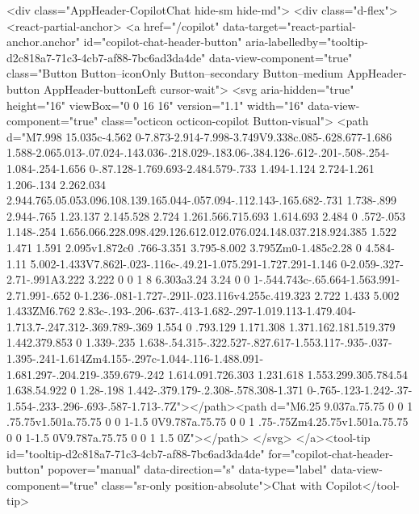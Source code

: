         
          <div class="AppHeader-CopilotChat hide-sm hide-md">
  <div class="d-flex">
    <react-partial-anchor>
        <a href="/copilot" data-target="react-partial-anchor.anchor" id="copilot-chat-header-button" aria-labelledby="tooltip-d2c818a7-71c3-4cb7-af88-7bc6ad3da4de" data-view-component="true" class="Button Button--iconOnly Button--secondary Button--medium AppHeader-button AppHeader-buttonLeft cursor-wait">  <svg aria-hidden="true" height="16" viewBox="0 0 16 16" version="1.1" width="16" data-view-component="true" class="octicon octicon-copilot Button-visual">
    <path d="M7.998 15.035c-4.562 0-7.873-2.914-7.998-3.749V9.338c.085-.628.677-1.686 1.588-2.065.013-.07.024-.143.036-.218.029-.183.06-.384.126-.612-.201-.508-.254-1.084-.254-1.656 0-.87.128-1.769.693-2.484.579-.733 1.494-1.124 2.724-1.261 1.206-.134 2.262.034 2.944.765.05.053.096.108.139.165.044-.057.094-.112.143-.165.682-.731 1.738-.899 2.944-.765 1.23.137 2.145.528 2.724 1.261.566.715.693 1.614.693 2.484 0 .572-.053 1.148-.254 1.656.066.228.098.429.126.612.012.076.024.148.037.218.924.385 1.522 1.471 1.591 2.095v1.872c0 .766-3.351 3.795-8.002 3.795Zm0-1.485c2.28 0 4.584-1.11 5.002-1.433V7.862l-.023-.116c-.49.21-1.075.291-1.727.291-1.146 0-2.059-.327-2.71-.991A3.222 3.222 0 0 1 8 6.303a3.24 3.24 0 0 1-.544.743c-.65.664-1.563.991-2.71.991-.652 0-1.236-.081-1.727-.291l-.023.116v4.255c.419.323 2.722 1.433 5.002 1.433ZM6.762 2.83c-.193-.206-.637-.413-1.682-.297-1.019.113-1.479.404-1.713.7-.247.312-.369.789-.369 1.554 0 .793.129 1.171.308 1.371.162.181.519.379 1.442.379.853 0 1.339-.235 1.638-.54.315-.322.527-.827.617-1.553.117-.935-.037-1.395-.241-1.614Zm4.155-.297c-1.044-.116-1.488.091-1.681.297-.204.219-.359.679-.242 1.614.091.726.303 1.231.618 1.553.299.305.784.54 1.638.54.922 0 1.28-.198 1.442-.379.179-.2.308-.578.308-1.371 0-.765-.123-1.242-.37-1.554-.233-.296-.693-.587-1.713-.7Z"></path><path d="M6.25 9.037a.75.75 0 0 1 .75.75v1.501a.75.75 0 0 1-1.5 0V9.787a.75.75 0 0 1 .75-.75Zm4.25.75v1.501a.75.75 0 0 1-1.5 0V9.787a.75.75 0 0 1 1.5 0Z"></path>
</svg>
</a><tool-tip id="tooltip-d2c818a7-71c3-4cb7-af88-7bc6ad3da4de" for="copilot-chat-header-button" popover="manual" data-direction="s" data-type="label" data-view-component="true" class="sr-only position-absolute">Chat with Copilot</tool-tip>

